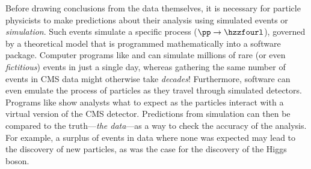 Before drawing conclusions from the data themselves, it is necessary for particle physicists to make predictions about their analysis using simulated events or \emph{simulation}.
Such events simulate a specific process (\eg $\pp \to \hzzfourl$), governed by a theoretical model that is programmed mathematically into a software package.
Computer programs like \MGvATNLO and \POWHEG can simulate millions of rare (or even \emph{fictitious}) events in just a single day, whereas gathering the same number of events in CMS data might otherwise take \emph{decades}!
Furthermore, software can even emulate the process of particles as they travel through simulated detectors.
Programs like \GEANTfour show analysts what to expect as the particles interact with a virtual version of the CMS detector.
Predictions from simulation can then be compared to the truth---\emph{the data}---as a way to check the accuracy of the analysis.
For example, a surplus of events in data where none was expected may lead to the discovery of new particles, as was the case for the discovery of the Higgs boson.

